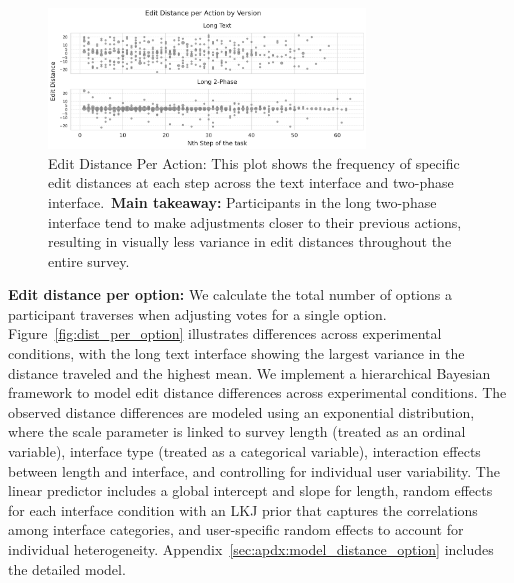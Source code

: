 \begin{figure}[h!]
    \centering
    \includegraphics[width=0.75\textwidth]{content/image/distance/edit_distance_per_action_by_version.pdf}
    \caption{Edit Distance Per Action: This plot shows the frequency of specific edit distances at each step across the text interface and two-phase interface.~\textbf{Main takeaway:} Participants in the long two-phase interface tend to make adjustments closer to their previous actions, resulting in visually less variance in edit distances throughout the entire survey.}
    \label{fig:step-over-distance}
\end{figure}

\textbf{Edit distance per option:} We calculate the total number of options a participant traverses when adjusting votes for a single option. Figure~\ref{fig:dist_per_option} illustrates differences across experimental conditions, with the long text interface showing the largest variance in the distance traveled and the highest mean. We implement a hierarchical Bayesian framework to model edit distance differences across experimental conditions. The observed distance differences are modeled using an exponential distribution, where the scale parameter is linked to survey length (treated as an ordinal variable), interface type (treated as a categorical variable), interaction effects between length and interface, and controlling for individual user variability. The linear predictor includes a global intercept and slope for length, random effects for each interface condition with an LKJ prior that captures the correlations among interface categories, and user-specific random effects to account for individual heterogeneity. Appendix~\ref{sec:apdx:model_distance_option} includes the detailed model.


